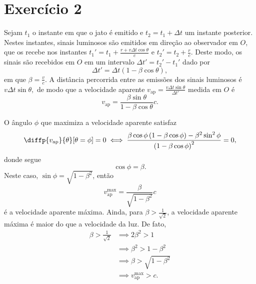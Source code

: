 \section*{Exercício 2}
Sejam \(t_1\) o instante em que o jato é emitido e \(t_2 = t_1 + \Delta t\) um instante posterior. Nestes instantes, sinais luminosos são emitidos em direção ao observador em \(O\), que os recebe nos instantes \(t_1' = t_1 + \frac{r + v\Delta t \cos\theta}{c}\) e \(t_2' = t_2 + \frac{r}{c}\). Deste modo, os sinais são recebidos em \(O\) em um intervalo \(\Delta t' = t_2' - t_1'\) dado por
\begin{equation*}
    \Delta t' = \Delta t \left(1 - \beta\cos\theta\right),
\end{equation*}
em que \(\beta = \frac{v}{c}\). A distância percorrida entre as emissões dos sinais luminosos é \(v\Delta t \sin\theta,\) de modo que a velocidade aparente \(v_{\mathrm{ap}} = \frac{v \Delta t \sin\theta}{\Delta t'}\) medida em \(O\) é
\begin{equation*}
    v_{\mathrm{ap}} = \frac{\beta \sin \theta}{1 - \beta \cos \theta}c.
\end{equation*}

O ângulo \(\phi\) que maximiza a velocidade aparente satisfaz
\begin{equation*}
    \diffp{v_\mathrm{ap}}{\theta}[\theta = \phi] = 0 \iff \frac{\beta \cos \phi \left(1 - \beta \cos\phi\right) - \beta^2\sin^2\phi}{\left(1 - \beta \cos\phi\right)^2} = 0,
\end{equation*}
donde segue
\begin{equation*}
    \cos\phi = \beta.
\end{equation*}
Neste caso, \(\sin \phi = \sqrt{1 - \beta^2}\), então
\begin{equation*}
    v_\mathrm{ap}^\mathrm{max} = \frac{\beta}{\sqrt{1-\beta^2}} c
\end{equation*}
é a velocidade aparente máxima. Ainda, para \(\beta > \frac{1}{\sqrt2}\), a velocidade aparente máxima é maior do que a velocidade da luz. De fato,
\begin{align*}
    \beta > \frac{1}{\sqrt{2}} &\implies 2\beta^2 > 1\\
                               &\implies \beta^2 > 1 - \beta^2\\
                               &\implies \beta > \sqrt{1 - \beta^2}\\
                               &\implies v_\mathrm{ap}^\mathrm{max} > c.
\end{align*}


